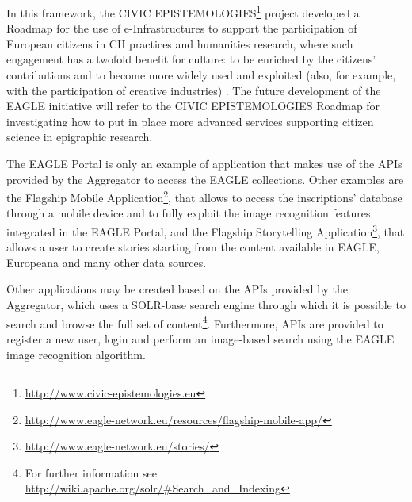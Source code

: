\documentclass[amsthm,ebook]{saparticle}
\begin{document}
In this framework, the CIVIC EPISTEMOLOGIES\footnote{\url{http://www.civic-epistemologies.eu}} project developed a Roadmap
for the use of e-Infrastructures to support the participation of European citizens in CH practices and humanities
research, where such engagement has a twofold benefit for culture: to be enriched by the citizens’ contributions and to
become more widely used and exploited (also, for example, with the participation of creative industries) \citep{fresa_roadmap_2015}. The future development of the EAGLE initiative will refer to the CIVIC EPISTEMOLOGIES Roadmap for
investigating how to put in place more advanced services supporting citizen science in epigraphic research.

The EAGLE Portal is only an example of application that makes use of the APIs provided by the Aggregator to access the
EAGLE collections. Other examples are the Flagship Mobile Application\footnote{\url{http://www.eagle-network.eu/resources/flagship-mobile-app/}}, that allows to access the inscriptions’ database through
a mobile device and to fully exploit the image recognition features integrated in the EAGLE Portal, and the Flagship
Storytelling Application\footnote{\url{http://www.eagle-network.eu/stories/}}, that allows a user to create stories
starting from the content available in EAGLE, Europeana and many other data sources.

Other applications may be created based on the APIs provided by the Aggregator, which uses a SOLR-base search engine
through which it is possible to search and browse the full set of content\footnote{ For further information see
\url{http://wiki.apache.org/solr/\#Search\_and\_Indexing}}. Furthermore, APIs are provided to register a new user, login and
perform an image-based search using the EAGLE image recognition algorithm.




\end{document}
